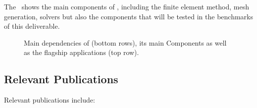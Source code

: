 The~ shows the main components of \Feelpp, including the finite element method, mesh generation, solvers but also the components that will be tested in the benchmarks of this deliverable.

\begin{figure}
        \centering
        
        \caption{Main dependencies of \Feelpp(bottom rows), its main Components as well as the flagship applications (top row).}
        \label{fig:Feelpp:components}
\end{figure}



\subsection{Relevant Publications}
\label{sec:Feelpp:publications}
Relevant publications include:

